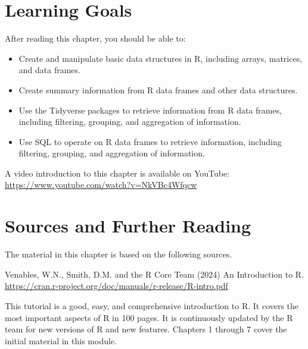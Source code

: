 %
%
\section*{Learning Goals}

After reading this chapter, you should be able to:
\begin{itemize}
   \item Create and manipulate basic data structures in R, including arrays, matrices, and data frames.
   \item Create summary information from R data frames and other data structures.
   \item Use the Tidyverse packages to retrieve information from R data frames, including filtering, grouping, and aggregation of information.
   \item Use SQL to operate on R data frames to retrieve information, including filtering, grouping, and aggregation of information.
\end{itemize}


\begin{advanced}
\begin{videobox}
A video introduction to this chapter is available on YouTube:\\

\url{https://www.youtube.com/watch?v=NkVBc4Wfqcw}
\end{videobox}
\end{advanced}


\section*{Sources and Further Reading}

The material in this chapter is based on the following sources. 

\begin{resourcebox}
Venables, W.N., Smith, D.M. and the R Core Team (2024) An Introduction to R.  \\

\footnotesize
\url{https://cran.r-project.org/doc/manuals/r-release/R-intro.pdf}\normalsize
\end{resourcebox}

This tutorial is a good, easy, and comprehensive introduction to R. It covers the most important aspects of R in 100 pages. It is continuously updated by the R team for new versions of R and new features. Chapters 1 through 7 cover the initial material in this module. 

